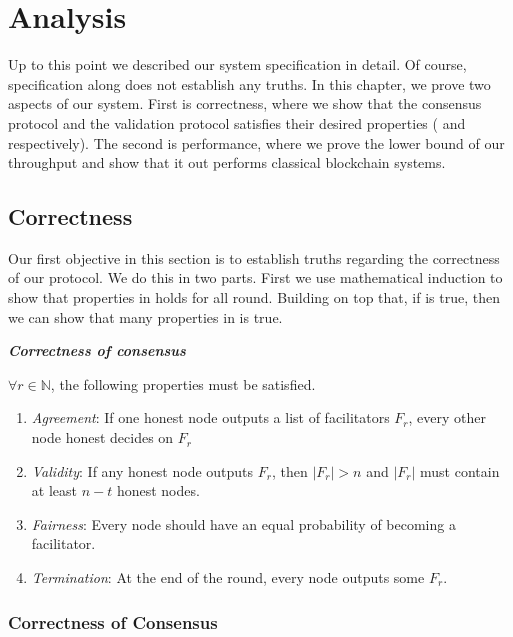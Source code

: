 \chapter{Analysis}
\label{ch:analysis}

Up to this point we described our system specification in detail.
Of course, specification along does not establish any truths.
In this chapter, we prove two aspects of our system.
First is correctness,
where we show that the consensus protocol and the validation protocol satisfies their desired properties
( and  respectively).
The second is performance,
where we prove the lower bound of our throughput and show that it out performs classical blockchain systems.

\section{Correctness}
Our first objective in this section is to establish truths regarding the correctness of our protocol.
We do this in two parts.
First we use mathematical induction to show that properties in  holds for all round.
Building on top that, if  is true, then we can show that many properties in  is true.

\textbf{\emph{Correctness of consensus}}

$\forall r \in \mathbb{N}$, the following properties must be satisfied.
\begin{enumerate}
    \item \emph{Agreement}:
        If one honest node outputs a list of facilitators $F_r$,
        every other node honest decides on $F_r$
    \item \emph{Validity}:
        If any honest node outputs $F_r$, then $|F_r| > n$ and $|F_r|$ must contain at least $n - t$ honest nodes.
    \item \emph{Fairness}:
        Every node should have an equal probability of becoming a facilitator.
    \item \emph{Termination}:
        At the end of the round, every node outputs some $F_r$.
\end{enumerate}


\subsection{Correctness of Consensus}

